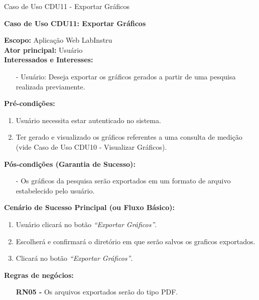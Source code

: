 \begin{quadro}[H]
	\centering
	\caption{Caso de Uso CDU11 - Exportar Gráficos}

	\begin{framed}

		\textbf{Caso de Uso CDU11: Exportar Gráficos}\\

		\begin{flushleft}

		\textbf{Escopo:} Aplicação Web LabInstru\\

		\textbf{Ator principal:} Usuário\\

		\textbf{Interessados e Interesses:}
		\begin{itemize}
			\item[-] Usuário: Deseja exportar os gráficos gerados a partir de uma pesquisa realizada previamente.
		\end{itemize}

		\textbf{Pré-condições:}\\
			 \begin{enumerate}
			 	\item{Usuário necessita estar autenticado no sistema.}
			 	\item{Ter gerado e visualizado os gráficos referentes a uma consulta de medição (vide Caso de Uso CDU10 - Visualizar Gráficos).}
			 \end{enumerate}

		\textbf{Pós-condições (Garantia de Sucesso):}
		\begin{itemize}
			\item[-] Os gráficos da pesquisa serão exportados em um formato de arquivo estabelecido pelo usuário.
		\end{itemize}

		\textbf{Cenário de Sucesso Principal (ou Fluxo Básico):}\\
			\begin{enumerate}
			 	\item{Usuário clicará no botão \textit{``Exportar Gráficos''}.}
			 	\item{Escolherá e confirmará o diretório em que serão salvos os graficos exportados.}
			 	\item{Clicará no botão \textit{``Exportar Gráficos''}.}
			 \end{enumerate}

		\textbf{Regras de negócios:}
		\begin{itemize}
			\item[] \textbf{RN05 - } Os arquivos exportados serão do tipo PDF.
		\end{itemize}
		\end{flushleft}

	\end{framed}

\end {quadro} %



